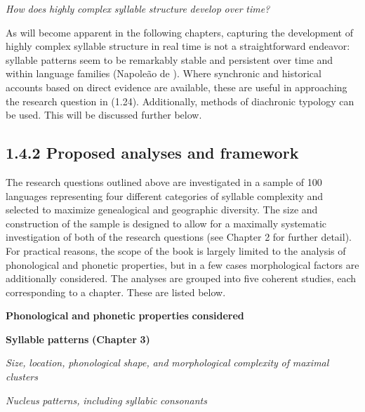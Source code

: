 \ea\label{ex:(1.24)}
   \textit{How} \textit{does} \textit{highly} \textit{complex} \textit{syllable} \textit{structure} \textit{develop} \textit{over} \textit{time?}
\z



  As will become apparent in the following chapters, capturing the development of highly complex syllable structure in real time is not a straightforward endeavor: syllable patterns seem to be remarkably stable and persistent over time and within language families (Napoleão de \citealt{Souza2017}). Where synchronic and historical accounts based on direct evidence are available, these are useful in approaching the research question in (1.24). Additionally, methods of diachronic typology can be used. This will be discussed further below.


\subsection{1.4.2 Proposed analyses and framework}

  The research questions outlined above are investigated in a sample of 100 languages representing four different categories of syllable complexity and selected to maximize genealogical and geographic diversity. The size and construction of the sample is designed to allow for a maximally systematic investigation of both of the research questions (see Chapter 2 for further detail). For practical reasons, the scope of the book is largely limited to the analysis of phonological and phonetic properties, but in a few cases morphological factors are additionally considered. The analyses are grouped into five coherent studies, each corresponding to a chapter. These are listed below.



\ea\label{ex:(1.25)}
  \textbf{Phonological} \textbf{and} \textbf{phonetic} \textbf{properties} \textbf{considered}



\textbf{Syllable} \textbf{patterns} \textbf{(Chapter} \textbf{3)}



\textit{Size,} \textit{location,} \textit{phonological} \textit{shape,} \textit{and} \textit{morphological} \textit{complexity} \textit{of} \textit{maximal} \textit{clusters}



\textit{Nucleus} \textit{patterns,} \textit{including} \textit{syllabic} \textit{consonants}



